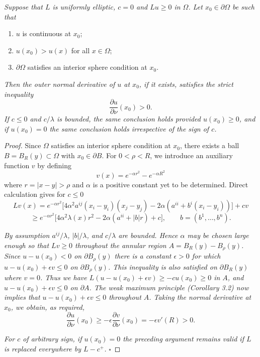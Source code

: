 
\begin{lemma}\label{gt-ch3-hopf}
\emph{Suppose that $L$ is uniformly elliptic, $c=0$ and $Lu\geq 0$ in $\Omega$. Let $x_0\in\partial\Omega$ be such that}
\begin{enumerate}
\item[(i)] $u$ is continuous at $x_0$;
\item[(ii)] $u(x_0)>u(x)$ for all $x\in\Omega$;
\item[(iii)] $\partial\Omega$ satisfies an interior sphere condition at $x_0$.
\end{enumerate}
\emph{Then the outer normal derivative of $u$ at $x_0$, if it exists, satisfies the strict inequality}
\[
\tag{3.10}
\frac{\partial u}{\partial\nu}(x_0)>0.
\]
\emph{If $c\leq 0$ and $c/\lambda$ is bounded, the same conclusion holds provided $u(x_0)\geq 0$, and if $u(x_0)=0$ the same conclusion holds irrespective of the sign of $c$.}
\end{lemma}

\begin{proof}
Since $\Omega$ satisfies an interior sphere condition at $x_0$, there exists a ball $B=B_R(y)\subset\Omega$ with $x_0\in\partial B$. For $0<\rho<R$, we introduce an auxiliary function $v$ by defining
\[
v(x)=e^{-\alpha r^2}-e^{-\alpha R^2}
\]
where $r=\lvert x-y\rvert>\rho$ and $\alpha$ is a positive constant yet to be determined. Direct calculation gives for $c\leq 0$
\[
Lv(x)=e^{-\alpha r^2}\bigl[4\alpha^2 a^{ij}(x_i-y_i)(x_j-y_j)-2\alpha(a^{ii}+b^i(x_i-y_i))\bigr]+cv
\]
\[
\geq e^{-\alpha r^2}\bigl[4\alpha^2\lambda(x)r^2-2\alpha(a^{ii}+\lvert b\rvert r)+c\bigr],\qquad b=(b^1,\ldots,b^n).
\]

\emph{By assumption $a^{ij}/\lambda$, $\lvert b\rvert/\lambda$, and $c/\lambda$ are bounded. Hence $\alpha$ may be chosen large enough so that $Lv\geq 0$ throughout the annular region $A=B_R(y)-B_\rho(y)$. Since $u-u(x_0)<0$ on $\partial B_\rho(y)$ there is a constant $\epsilon>0$ for which $u-u(x_0)+\epsilon v\leq 0$ on $\partial B_\rho(y)$. This inequality is also satisfied on $\partial B_R(y)$ where $v=0$. Thus we have $L(u-u(x_0)+\epsilon v)\geq -cu(x_0)\geq 0$ in $A$, and $u-u(x_0)+\epsilon v\leq 0$ on $\partial A$. The weak maximum principle (Corollary 3.2) now implies that $u-u(x_0)+\epsilon v\leq 0$ throughout $A$. Taking the normal derivative at $x_0$, we obtain, as required,}
\[
\frac{\partial u}{\partial\nu}(x_0)\geq -\epsilon \frac{\partial v}{\partial\nu}(x_0)=-\epsilon v'(R)>0.
\]

\emph{For $c$ of arbitrary sign, if $u(x_0)=0$ the preceding argument remains valid if $L$ is replaced everywhere by $L-c^+$.} $\square$
\end{proof}

